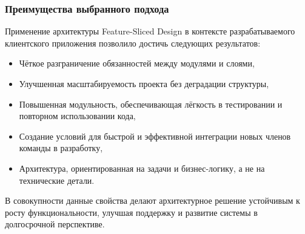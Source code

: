 \subsubsection*{Преимущества выбранного подхода}

Применение архитектуры Feature-Sliced Design в контексте разрабатываемого клиентского приложения позволило достичь следующих результатов:
\begin{itemize}
  \item Чёткое разграничение обязанностей между модулями и слоями,
  \item Улучшенная масштабируемость проекта без деградации структуры,
  \item Повышенная модульность, обеспечивающая лёгкость в тестировании и повторном использовании кода,
  \item Создание условий для быстрой и эффективной интеграции новых членов команды в разработку,
  \item Архитектура, ориентированная на задачи и бизнес-логику, а не на технические детали.
\end{itemize}

В совокупности данные свойства делают архитектурное решение устойчивым к росту функциональности, улучшая поддержку и развитие системы в долгосрочной перспективе.
